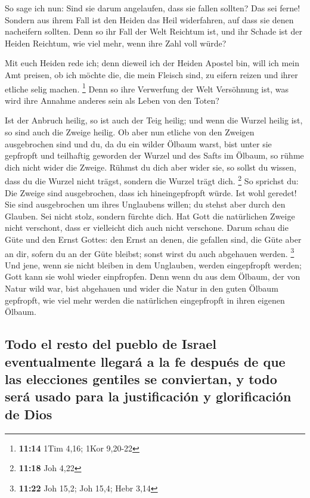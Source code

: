  So sage ich nun: Sind sie darum angelaufen, dass sie
fallen sollten? Das sei ferne! Sondern aus ihrem Fall ist den Heiden das
Heil widerfahren, auf dass sie denen nacheifern sollten. 
Denn so ihr Fall der Welt Reichtum ist, und ihr Schade ist der Heiden
Reichtum, wie viel mehr, wenn ihre Zahl voll würde?

 Mit euch Heiden rede ich; denn dieweil ich der Heiden
Apostel bin, will ich mein Amt preisen,  ob ich möchte
die, die mein Fleisch sind, zu eifern reizen und ihrer etliche selig
machen. \footnote{\textbf{11:14} 1Tim 4,16; 1Kor 9,20-22}
 Denn so ihre Verwerfung der Welt Versöhnung ist, was
wird ihre Annahme anderes sein als Leben von den Toten?

 Ist der Anbruch heilig, so ist auch der Teig heilig; und
wenn die Wurzel heilig ist, so sind auch die Zweige heilig.
 Ob aber nun etliche von den Zweigen ausgebrochen sind
und du, da du ein wilder Ölbaum warst, bist unter sie gepfropft und
teilhaftig geworden der Wurzel und des Safts im Ölbaum, 
so rühme dich nicht wider die Zweige. Rühmst du dich aber wider sie, so
sollst du wissen, dass du die Wurzel nicht trägst, sondern die Wurzel
trägt dich. \footnote{\textbf{11:18} Joh 4,22}  So
sprichst du: Die Zweige sind ausgebrochen, dass ich hineingepfropft
würde.  Ist wohl geredet! Sie sind ausgebrochen um ihres
Unglaubens willen; du stehst aber durch den Glauben. Sei nicht stolz,
sondern fürchte dich.  Hat Gott die natürlichen Zweige
nicht verschont, dass er vielleicht dich auch nicht verschone.
 Darum schau die Güte und den Ernst Gottes: den Ernst an
denen, die gefallen sind, die Güte aber an dir, sofern du an der Güte
bleibst; sonst wirst du auch abgehauen werden. \footnote{\textbf{11:22}
  Joh 15,2; Joh 15,4; Hebr 3,14}  Und jene, wenn sie
nicht bleiben in dem Unglauben, werden eingepfropft werden; Gott kann
sie wohl wieder einpfropfen.  Denn wenn du aus dem
Ölbaum, der von Natur wild war, bist abgehauen und wider die Natur in
den guten Ölbaum gepfropft, wie viel mehr werden die natürlichen
eingepfropft in ihren eigenen Ölbaum.

\hypertarget{todo-el-resto-del-pueblo-de-israel-eventualmente-llegaruxe1-a-la-fe-despuuxe9s-de-que-las-elecciones-gentiles-se-conviertan-y-todo-seruxe1-usado-para-la-justificaciuxf3n-y-glorificaciuxf3n-de-dios}{%
\subsection{Todo el resto del pueblo de Israel eventualmente llegará a
la fe después de que las elecciones gentiles se conviertan, y todo será
usado para la justificación y glorificación de
Dios}\label{todo-el-resto-del-pueblo-de-israel-eventualmente-llegaruxe1-a-la-fe-despuuxe9s-de-que-las-elecciones-gentiles-se-conviertan-y-todo-seruxe1-usado-para-la-justificaciuxf3n-y-glorificaciuxf3n-de-dios}}

